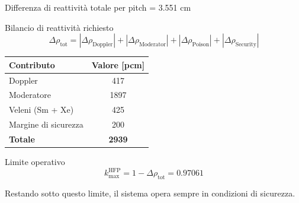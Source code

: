 \documentclass[aspectratio=169]{beamer} %
\begin{document}
    
\begin{frame}{Differenza di reattività totale per pitch = 3.551 cm}

    \begin{block}{Bilancio di reattività richiesto}
        \begin{equation*}
            \Delta\rho_{\text{tot}} = |\Delta\rho_{\text{Doppler}}| + |\Delta\rho_{\text{Moderator}}| + |\Delta\rho_{\text{Poison}}| + |\Delta\rho_{\text{Security}}|
        \end{equation*}
    \end{block}

    \vspace{0.5em}

    \begin{table}[h]
        \centering
        \begin{tabular}{lc}
            \toprule
            \textbf{Contributo} & \textbf{Valore [pcm]} \\
            \midrule
            Doppler & 417 \\
            Moderatore & 1897 \\
            Veleni (Sm + Xe) & 425 \\
            Margine di sicurezza & 200 \\
            \midrule
            \textbf{Totale} & \textbf{2939} \\
            \bottomrule
        \end{tabular}
    \end{table}

    \vspace{0.5em}

    \begin{alertblock}{Limite operativo}
        \begin{equation*}
            k^{\text{HFP}}_{\text{max}} = 1 - \Delta\rho_{\text{tot}} = \mathbf{0.97061}
        \end{equation*}
    \end{alertblock}

    \vfill
    \centering
    \small Restando sotto questo limite, il sistema opera sempre in condizioni di sicurezza.

\end{frame}
\end{document}
